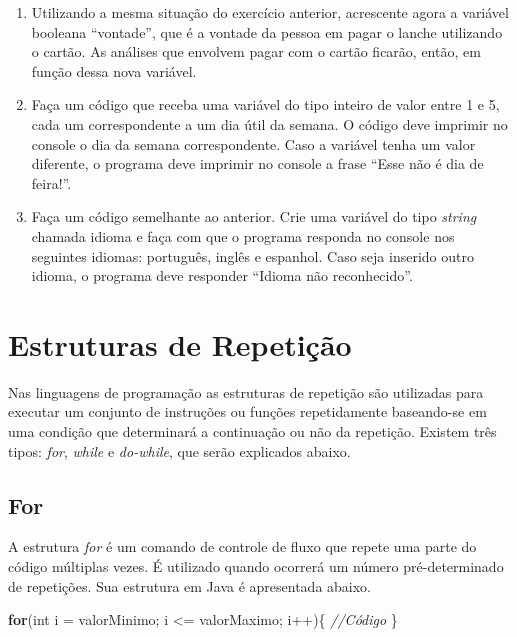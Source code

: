 \documentclass[
]{book}
\newenvironment{Shaded}{\begin{snugshade}}{\end{snugshade}}
\newcommand{\CommentTok}[1]{\textcolor[rgb]{0.56,0.35,0.01}{\textit{#1}}}
\newcommand{\DataTypeTok}[1]{\textcolor[rgb]{0.13,0.29,0.53}{#1}}
\newcommand{\KeywordTok}[1]{\textcolor[rgb]{0.13,0.29,0.53}{\textbf{#1}}}
\newcommand{\NormalTok}[1]{#1}
\providecommand{\tightlist}{%
  \setlength{\itemsep}{0pt}\setlength{\parskip}{0pt}}
\begin{document}
\begin{enumerate}
\def\labelenumi{\arabic{enumi}.}
\setcounter{enumi}{3}
\tightlist
\item
  Utilizando a mesma situação do exercício anterior, acrescente agora a variável booleana ``vontade'', que é a vontade da pessoa em pagar o lanche utilizando o cartão. As análises que envolvem pagar com o cartão ficarão, então, em função dessa nova variável.
\item
  Faça um código que receba uma variável do tipo inteiro de valor entre 1 e 5, cada um correspondente a um dia útil da semana. O código deve imprimir no console o dia da semana correspondente. Caso a variável tenha um valor diferente, o programa deve imprimir no console a frase ``Esse não é dia de feira!''.
\item
  Faça um código semelhante ao anterior. Crie uma variável do tipo \emph{string} chamada idioma e faça com que o programa responda no console nos seguintes idiomas: português, inglês e espanhol. Caso seja inserido outro idioma, o programa deve responder ``Idioma não reconhecido''.
\end{enumerate}

\hypertarget{estruturas-de-repetiuxe7uxe3o}{%
\chapter{Estruturas de Repetição}\label{estruturas-de-repetiuxe7uxe3o}}

Nas linguagens de programação as estruturas de repetição são utilizadas para executar um conjunto de instruções ou funções repetidamente baseando-se em uma condição que determinará a continuação ou não da repetição. Existem três tipos: \emph{for}, \emph{while} e \emph{do-while}, que serão explicados abaixo.

\hypertarget{for}{%
\section{For}\label{for}}

A estrutura \emph{for} é um comando de controle de fluxo que repete uma parte do código múltiplas vezes. É utilizado quando ocorrerá um número pré-determinado de repetições. Sua estrutura em Java é apresentada abaixo.

\begin{Shaded}
\begin{Highlighting}[]
\KeywordTok{for}\NormalTok{(}\DataTypeTok{int}\NormalTok{ i = valorMinimo; i <= valorMaximo; i++)\{}
    \CommentTok{//Código}
\NormalTok{\}}
\end{Highlighting}
\end{Shaded}
\end{document}
